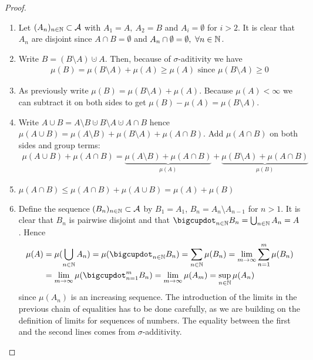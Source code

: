 \begin{thm}
	\begin{proof}$ $\newline
		\begin{enumerate}
			\item Let $(A_n)_{n\in\mathbb{N}} \subset \mathcal{A}$ with $A_1 = A,\ A_2 = B$ and $A_i = \emptyset$ for $i > 2$. It is clear that $A_n$ are disjoint since $A\cap B = \emptyset$ and $A_n \cap \emptyset = \emptyset,\ \forall n \in \mathbb{N}$.
			\item Write $B = (B\setminus A) \cupdot A$. Then, because of $\sigma$-aditivity we have
			\begin{align*}
				\mu(B) = \mu(B\setminus A) + \mu(A) \geq \mu(A) \text{ since } \mu(B\setminus A) \geq 0
			\end{align*} 
			\item As previously write $\mu(B) = \mu(B\setminus A) + \mu(A)$. Because $\mu(A) < \infty$ we can subtract it on both sides to get $\mu(B) -\mu(A) = \mu(B\setminus A)$.
			\item Write $A \cup B = A \setminus B \cupdot B \setminus A \cupdot A \cap B$ hence $\mu(A \cup B) = \mu(A \setminus B) + \mu(B \setminus A) + \mu(A \cap B)$. Add $\mu(A \cap B)$ on both sides and group terms:
			\begin{align*}
				\mu(A \cup B) + \mu(A \cap B) = \underbrace{\mu(A \setminus B) + \mu(A \cap B)}_{\mu(A)} + \underbrace{\mu(B \setminus A) + \mu(A \cap B)}_{\mu(B)}
			\end{align*}
			\item $\mu(A\cap B) \leq \mu(A \cap B)+ \mu(A \cup B) = \mu(A) + \mu(B)$
			\item Define the sequence $(B_n)_{n\in\mathbb{N}} \subset \mathcal{A}$ by $B_1 = A_1$, $B_n = A_n\setminus A_{n-1}$ for $n > 1$. It is clear that $B_n$ is pairwise disjoint and that $\bigcupdot_{n \in \N} B_n = \bigcup_{n \in \N} A_n = A$. Hence
			\begin{align*}
				\mu(A) &= \mu(\bigcup_{n \in \N} A_n) = \mu(\bigcupdot_{n \in \N} B_n) = \sum_{n\in \N} \mu(B_n) = \lim_{m \to \infty} \sum_{n = 1}^m\mu(B_n) \\
				&= \lim_{m \to \infty} \mu (\bigcupdot_{n = 1}^m B_n) = \lim_{m \to \infty} \mu (A_m) = \sup_{n\in\N} \mu(A_n)
			\end{align*}
			since $\mu(A_n)$ is an increasing sequence. The introduction of the limits in the previous chain of equalities has to be done carefully, as we are building on the definition of limits for sequences of numbers. The equality between the first and the second lines comes from $\sigma$-additivity.
		\end{enumerate}
	\end{proof}
\end{thm}